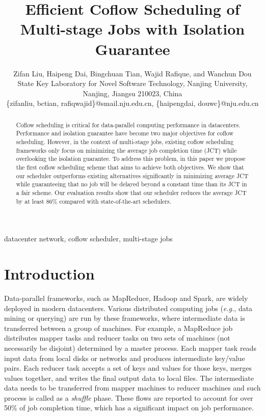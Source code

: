 \documentclass[10pt, conference, letterpaper]{IEEEtran}
\begin{document}
\title{Efficient Coflow Scheduling of Multi-stage Jobs with Isolation Guarantee}

\author{Zifan Liu, Haipeng Dai, Bingchuan Tian, Wajid Rafique, and Wanchun Dou\\
State Key Laboratory for Novel Software Technology, Nanjing University, Nanjing, Jiangsu 210023, China\\
\{zifanliu, bctian, rafiqwajid\}@smail.nju.edu.cn, \{haipengdai, douwc\}@nju.edu.cn}

\maketitle

\begin{abstract}
Coflow scheduling is critical for data-parallel computing performance in datacenters. Performance and isolation guarantee have become two major objectives for coflow scheduling. However, in the context of multi-stage jobs, existing coflow scheduling frameworks only focus on minimizing the average job completion time (JCT) while overlooking the isolation guarantee. To address this problem, in this paper we propose the first coflow scheduling scheme that %
aims to achieve both objectives.
%
We show that our scheduler outperforms existing alternatives significantly in minimizing average JCT while guaranteeing that no job will be delayed beyond a constant time than its JCT in a fair scheme. Our evaluation results show that our scheduler reduces the average JCT by at least 86\% compared with state-of-the-art schedulers.
\end{abstract}

\begin{IEEEkeywords}
datacenter network, coflow scheduler, multi-stage jobs
\end{IEEEkeywords}

\section{Introduction}
Data-parallel frameworks, such as MapReduce\cite{MapReduce}, Hadoop\cite{Hadoop} and Spark\cite{Spark}, are widely deployed in modern datacenters. Various distributed computing jobs (\emph{e.g.}, data mining or querying) are run by these frameworks, where intermediate data is transferred between a group of machines. For example, a MapReduce job distributes mapper tasks and reducer tasks on two sets of machines (not necessarily be disjoint) determined by a master process. Each mapper task reads input data from local disks or networks and produces intermediate key/value pairs. Each reducer task accepts a set of keys and values for those keys, merges values together, and writes the final output data to local files. The intermediate data needs to be transferred from mapper machines to reducer machines and such process is called as a \emph{shuffle} phase. These flows are reported to account for over 50\% of job completion time, which has a significant impact on job performance.
\end{document}
